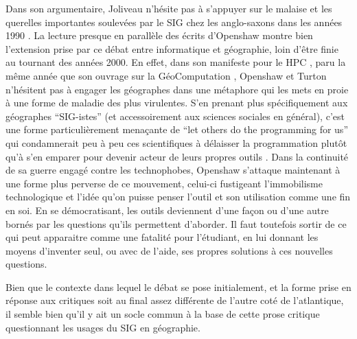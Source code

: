 Dans son argumentaire, Joliveau n'hésite pas à s'appuyer sur le malaise et les querelles importantes soulevées par le SIG chez les anglo-saxons dans les années 1990 \autocite[472-473]{Joliveau2004}. La lecture presque en parallèle des écrits d'Openshaw montre bien l'extension prise par ce débat entre informatique et géographie, loin d'être finie au tournant des années 2000. En effet, dans son manifeste pour le HPC \autocite[2]{Openshaw2000}, paru la même année que son ouvrage sur la GéoComputation \autocite{Openshaw2000b}, Openshaw et Turton n’hésitent pas à engager les géographes dans une métaphore qui les mets en proie à une forme de maladie des plus virulentes. S'en prenant plus spécifiquement aux géographes \enquote{SIG-istes} (et accessoirement aux sciences sociales en général), c’est une forme particulièrement menaçante de \foreignquote{english}{let others do the programming for us} qui condamnerait peu à peu ces scientifiques à délaisser la programmation plutôt qu’à s’en emparer pour devenir acteur de leurs propres outils . Dans la continuité de sa guerre engagé contre les technophobes, Openshaw s'attaque  maintenant à une forme plus perverse de ce mouvement, celui-ci fustigeant l'immobilisme technologique et l'idée qu'on puisse penser l'outil et son utilisation comme une fin en soi. En se démocratisant, les outils deviennent d'une façon ou d'une autre bornés par les questions qu'ils permettent d'aborder. Il faut toutefois sortir de ce qui peut apparaitre comme une fatalité pour l'étudiant, en lui donnant les moyens d'inventer seul, ou avec de l'aide, ses propres solutions à ces nouvelles questions.

Bien que le contexte dans lequel le débat se pose initialement, et la forme prise en réponse aux critiques soit au final assez différente de l'autre coté de l'atlantique, il semble bien qu'il y ait un socle commun à la base de cette prose critique questionnant les usages du SIG en géographie.


